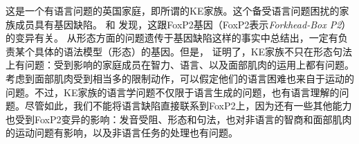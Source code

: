这是一个有语言问题的英国家庭，即所谓的KE家族。这个备受语言问题困扰的家族成员具有基因缺陷。 \citet{FVKWMP98a}和 \citet{LFHVM2001a}发现，这跟FoxP2基因（FoxP2表示\emph{Forkhead-Box P2}）的变异有关。 \citet{GC91a}从形态方面的问题遗传于基因缺陷这样的事实中总结出，一定有负责某个具体的语法模型（形态）的基因。但是， \citet[]{VKWAFP95a}证明了，KE家族不只在形态句法上有问题：受到影响的家庭成员在智力、语言、以及面部肌肉的运用上都有问题。考虑到面部肌肉受到相当多的限制动作，可以假定他们的语言困难也来自于运动的问题\citep[]{Tomasello2003a}。不过，KE家族的语言学问题不仅限于语言生成的问题，也有语言理解的问题\citep[]{Bishop2002a}。尽管如此，我们不能将语言缺陷直接联系到FoxP2上，因为还有一些其他能力也受到FoxP2变异的影响：发音受阻、形态和句法，也对非语言的智商和面部肌肉的运动问题有影响，以及非语言任务的处理也有问题\citep{VKWAFP95a}。


